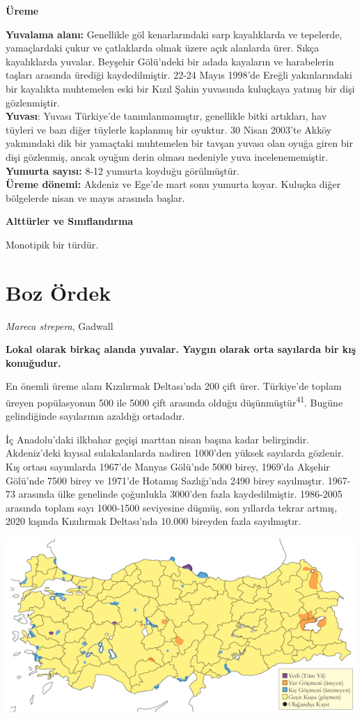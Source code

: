 \documentclass[
  letterpaper,
  DIV=11,
  numbers=noendperiod]{scrreprt}
\begin{document}
\textbf{Üreme}

\textbf{Yuvalama alanı:} Genellikle göl kenarlarındaki sarp kayalıklarda
ve tepelerde, yamaçlardaki çukur ve çatlaklarda olmak üzere açık
alanlarda ürer. Sıkça kayalıklarda yuvalar. Beyşehir Gölü'ndeki bir
adada kayaların ve harabelerin taşları arasında ürediği kaydedilmiştir.
22-24 Mayıs 1998'de Ereğli yakınlarındaki bir kayalıkta muhtemelen eski
bir Kızıl Şahin yuvasında kuluçkaya yatmış bir dişi gözlenmiştir.\\
\textbf{Yuvası}: Yuvası Türkiye'de tanımlanmamıştır, genellikle bitki
artıkları, hav tüyleri ve bazı diğer tüylerle kaplanmış bir oyuktur. 30
Nisan 2003'te Akköy yakınındaki dik bir yamaçtaki muhtemelen bir tavşan
yuvası olan oyuğa giren bir dişi gözlenmiş, ancak oyuğun derin olması
nedeniyle yuva incelenememiştir.\\
\textbf{Yumurta sayısı:} 8-12 yumurta koyduğu görülmüştür.\\
\textbf{Üreme dönemi:} Akdeniz ve Ege'de mart sonu yumurta koyar.
Kuluçka diğer bölgelerde nisan ve mayıs arasında başlar.

\textbf{Alttürler ve Sınıflandırma}

Monotipik bir türdür.

\section{Boz Ördek}\label{boz-uxf6rdek}

\emph{Mareca strepera}, Gadwall

\textbf{Lokal olarak birkaç alanda yuvalar. Yaygın olarak orta sayılarda
bir kış konuğudur.}

En önemli üreme alanı Kızılırmak Deltası'nda 200 çift ürer. Türkiye'de
toplam üreyen popülasyonun 500 ile 5000 çift arasında olduğu
düşünmüştür\textsuperscript{41}. Bugüne gelindiğinde sayılarının
azaldığı ortadadır.

İç Anadolu'daki ilkbahar geçişi marttan nisan başına kadar belirgindir.
Akdeniz'deki kıyısal sulakalanlarda nadiren 1000'den yüksek sayılarda
gözlenir. Kış ortası sayımlarda 1967'de Manyas Gölü'nde 5000 birey,
1969'da Akşehir Gölü'nde 7500 birey ve 1971'de Hotamış Sazlığı'nda 2490
birey sayılmıştır. 1967-73 arasında ülke genelinde çoğunlukla 3000'den
fazla kaydedilmiştir. 1986-2005 arasında toplam sayı 1000-1500
seviyesine düşmüş, son yıllarda tekrar artmış, 2020 kışında Kızılırmak
Deltası'nda 10.000 bireyden fazla sayılmıştır.

\includegraphics{images/harita_Page_014.png}
\end{document}

